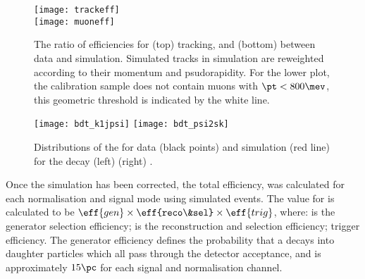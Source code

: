 
\begin{sidewaysfigure}
  \begin{center}
    \texttt{[image: trackeff]}\\
    \texttt{[image: muoneff]}
  \end{center}
  \caption[Corrections for {\tt isMuon} and tracking efficiency in simulation]
  {
    The ratio of efficiencies for (top) tracking, and (bottom) \ismuon between data and simulation.
    Simulated tracks in simulation are reweighted according to their momentum and psudorapidity.
    For the lower plot, the calibration sample does not contain muons with $\pt<800\mev$, this
    geometric threshold is indicated by the white line.
  }
  \label{fig:hhh:trackeff}
\end{sidewaysfigure}

\begin{figure}[t]
  \begin{center}
    \texttt{[image: bdt\_k1jpsi]}
    \texttt{[image: bdt\_psi2sk]}
    \caption[Distributions of BDT response in data and simulation]
    {
      Distributions of the \BDT for data (black points) and simulation (red line) for the decay
      (left) 
      (right) \btopsitwosk.
    }
    \label{fig:kpipi:bdt}
  \end{center}
\end{figure}

Once the simulation has been corrected, the total efficiency,  was calculated for each
normalisation and signal mode using simulated events.
The value for  is calculated to be $\eff{gen}\times\eff{reco\&sel}\times\eff{trig}$, where:
 is the generator selection efficiency;
 is the reconstruction and selection efficiency;
 trigger efficiency.
The generator efficiency defines the probability that a \Bp decays into daughter particles which
all pass through the \lhcb detector acceptance, and is approximately $15\pc$ for each signal and
normalisation channel.


